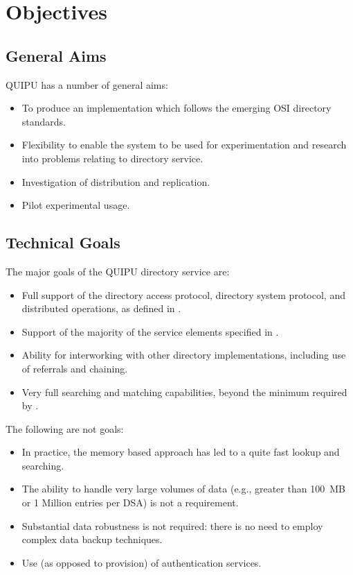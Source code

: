 \section {Objectives}

\subsection {General Aims}

QUIPU has a number of general aims:

\begin{itemize}
\item To produce an implementation which follows the
emerging OSI directory standards.  

\item Flexibility to enable the system to be used
for experimentation and research into problems relating to directory service.

\item Investigation of distribution and replication.

\item Pilot experimental usage.
\end{itemize}

\subsection {Technical Goals}

The major goals of the QUIPU directory service are:

\begin{itemize}
\item
Full support of the directory access protocol,
directory system protocol, and distributed operations, as 
defined in \cite{CCITT.Directory}.
\item
Support of the majority of the service elements specified in
\cite{CCITT.Directory}.
\item
Ability for interworking with other directory implementations, including
use of
referrals and chaining.
\item
Very full searching and matching capabilities, beyond the minimum
required by \cite{CCITT.Directory}.
\end{itemize}

The following are not goals:

\begin{itemize}
\item
In practice, the memory based approach has led to a quite fast lookup and
searching.
\item
The ability to handle very large volumes of data (e.g., greater than 100~MB
or 1 Million entries per DSA) is not a requirement.
\item
Substantial data robustness is not required: there is no need to employ
complex data backup techniques.
\item
Use (as opposed to provision) of authentication services.

\end{itemize}

